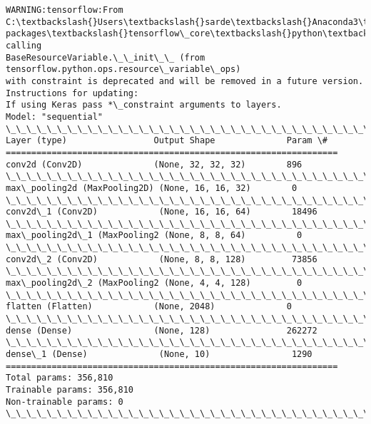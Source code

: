 \documentclass[11pt]{article}
\begin{document}
    \begin{Verbatim}[commandchars=\\\{\}]
WARNING:tensorflow:From C:\textbackslash{}Users\textbackslash{}sarde\textbackslash{}Anaconda3\textbackslash{}envs\textbackslash{}tensorflow\textbackslash{}lib\textbackslash{}site-
packages\textbackslash{}tensorflow\_core\textbackslash{}python\textbackslash{}ops\textbackslash{}resource\_variable\_ops.py:1630: calling
BaseResourceVariable.\_\_init\_\_ (from tensorflow.python.ops.resource\_variable\_ops)
with constraint is deprecated and will be removed in a future version.
Instructions for updating:
If using Keras pass *\_constraint arguments to layers.
Model: "sequential"
\_\_\_\_\_\_\_\_\_\_\_\_\_\_\_\_\_\_\_\_\_\_\_\_\_\_\_\_\_\_\_\_\_\_\_\_\_\_\_\_\_\_\_\_\_\_\_\_\_\_\_\_\_\_\_\_\_\_\_\_\_\_\_\_\_
Layer (type)                 Output Shape              Param \#
=================================================================
conv2d (Conv2D)              (None, 32, 32, 32)        896
\_\_\_\_\_\_\_\_\_\_\_\_\_\_\_\_\_\_\_\_\_\_\_\_\_\_\_\_\_\_\_\_\_\_\_\_\_\_\_\_\_\_\_\_\_\_\_\_\_\_\_\_\_\_\_\_\_\_\_\_\_\_\_\_\_
max\_pooling2d (MaxPooling2D) (None, 16, 16, 32)        0
\_\_\_\_\_\_\_\_\_\_\_\_\_\_\_\_\_\_\_\_\_\_\_\_\_\_\_\_\_\_\_\_\_\_\_\_\_\_\_\_\_\_\_\_\_\_\_\_\_\_\_\_\_\_\_\_\_\_\_\_\_\_\_\_\_
conv2d\_1 (Conv2D)            (None, 16, 16, 64)        18496
\_\_\_\_\_\_\_\_\_\_\_\_\_\_\_\_\_\_\_\_\_\_\_\_\_\_\_\_\_\_\_\_\_\_\_\_\_\_\_\_\_\_\_\_\_\_\_\_\_\_\_\_\_\_\_\_\_\_\_\_\_\_\_\_\_
max\_pooling2d\_1 (MaxPooling2 (None, 8, 8, 64)          0
\_\_\_\_\_\_\_\_\_\_\_\_\_\_\_\_\_\_\_\_\_\_\_\_\_\_\_\_\_\_\_\_\_\_\_\_\_\_\_\_\_\_\_\_\_\_\_\_\_\_\_\_\_\_\_\_\_\_\_\_\_\_\_\_\_
conv2d\_2 (Conv2D)            (None, 8, 8, 128)         73856
\_\_\_\_\_\_\_\_\_\_\_\_\_\_\_\_\_\_\_\_\_\_\_\_\_\_\_\_\_\_\_\_\_\_\_\_\_\_\_\_\_\_\_\_\_\_\_\_\_\_\_\_\_\_\_\_\_\_\_\_\_\_\_\_\_
max\_pooling2d\_2 (MaxPooling2 (None, 4, 4, 128)         0
\_\_\_\_\_\_\_\_\_\_\_\_\_\_\_\_\_\_\_\_\_\_\_\_\_\_\_\_\_\_\_\_\_\_\_\_\_\_\_\_\_\_\_\_\_\_\_\_\_\_\_\_\_\_\_\_\_\_\_\_\_\_\_\_\_
flatten (Flatten)            (None, 2048)              0
\_\_\_\_\_\_\_\_\_\_\_\_\_\_\_\_\_\_\_\_\_\_\_\_\_\_\_\_\_\_\_\_\_\_\_\_\_\_\_\_\_\_\_\_\_\_\_\_\_\_\_\_\_\_\_\_\_\_\_\_\_\_\_\_\_
dense (Dense)                (None, 128)               262272
\_\_\_\_\_\_\_\_\_\_\_\_\_\_\_\_\_\_\_\_\_\_\_\_\_\_\_\_\_\_\_\_\_\_\_\_\_\_\_\_\_\_\_\_\_\_\_\_\_\_\_\_\_\_\_\_\_\_\_\_\_\_\_\_\_
dense\_1 (Dense)              (None, 10)                1290
=================================================================
Total params: 356,810
Trainable params: 356,810
Non-trainable params: 0
\_\_\_\_\_\_\_\_\_\_\_\_\_\_\_\_\_\_\_\_\_\_\_\_\_\_\_\_\_\_\_\_\_\_\_\_\_\_\_\_\_\_\_\_\_\_\_\_\_\_\_\_\_\_\_\_\_\_\_\_\_\_\_\_\_
    \end{Verbatim}
\end{document}
